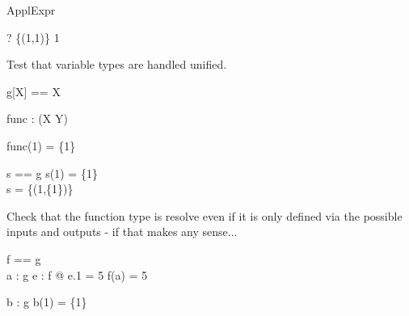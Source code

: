 \begin{zsection}
  \SECTION ApplExpr
\end{zsection}

\begin{zed} \vdash? \{(1,1)\} 1 \in \nat \end{zed}

Test that variable types are handled unified.
\begin{zed}
  g[X] == X
\end{zed}

\begin{gendef}[X,Y]
  func : \power (X \cross Y)
\end{gendef}

\begin{axdef}
\where
  func(1) = \{1\}
\end{axdef}

\begin{axdef}
  s == g
\where
  s(1) = \{1\}\\
  s = \{(1,\{1\})\}
\end{axdef}

Check that the function type is resolve even if it is only defined via 
the possible inputs and outputs - if that makes any sense...
\begin{axdef}
  f == g\\
  a : g
\where
  \exists e : f @ e.1 = 5 \land f(a) = 5
\end{axdef}

\begin{axdef}
  b : g
\where
  b(1) = \{1\}
\end{axdef}
